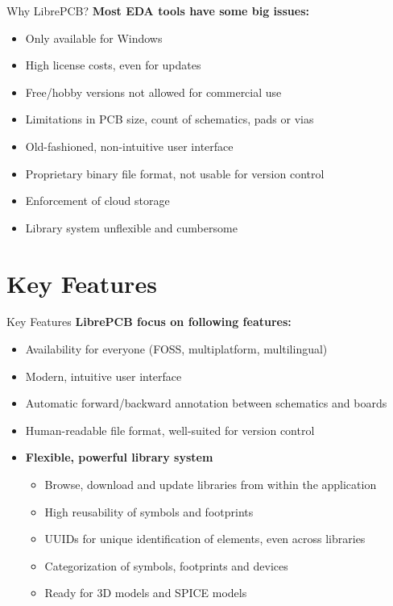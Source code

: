 \documentclass[aspectratio=1610,t]{beamer}
\begin{document}
\begin{frame}{Why LibrePCB?}
  \textbf{Most EDA tools have some big issues:}
  \begin{itemize}
   	\item Only available for Windows
    \item High license costs, even for updates
    \item Free/hobby versions not allowed for commercial use
    \item Limitations in PCB size, count of schematics, pads or vias
    \item Old-fashioned, non-intuitive user interface
    \item Proprietary binary file format, not usable for version control
    \item Enforcement of cloud storage
    \item Library system unflexible and cumbersome
  \end{itemize}
\end{frame}


\section{Key Features}

\begin{frame}{Key Features}
  \textbf{LibrePCB focus on following features:}
  \begin{itemize}
   	\item Availability for everyone (FOSS, multiplatform, multilingual)
    \item Modern, intuitive user interface
    \item Automatic forward/backward annotation between schematics and boards
    \item Human-readable file format, well-suited for version control
    \item \textbf{Flexible, powerful library system}
    	\begin{itemize}
    		\item Browse, download and update libraries from within the application
   			\item High reusability of symbols and footprints
   			\item UUIDs for unique identification of elements, even across libraries
   			\item Categorization of symbols, footprints and devices
   			\item Ready for 3D models and SPICE models
  		\end{itemize}
  \end{itemize}
\end{frame}
\end{document}
